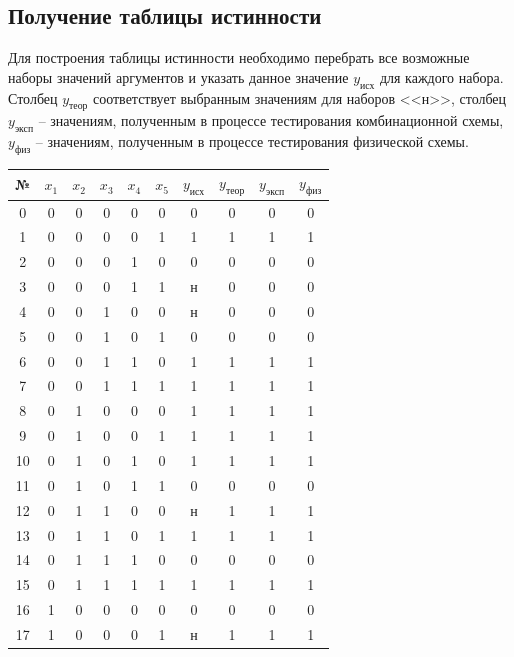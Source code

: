 \documentclass[a4paper,12pt]{article}
\begin{document}
    \subsection{Получение таблицы истинности}
    Для построения таблицы истинности необходимо перебрать все возможные
    наборы значений аргументов и указать данное значение $y_{\text{исх}}$ для каждого набора.
    Столбец $y_{\text{теор}}$ соответствует выбранным значениям для наборов <<н>>, столбец
    $y_{\text{эксп}}$ -- значениям, полученным в процессе тестирования комбинационной схемы,
    $y_{\text{физ}}$ -- значениям, полученным в процессе тестирования физической схемы.
    \begin{table}[H]
		\centering
		\begin{tabular}{|c|c|c|c|c|c|c|c|c|c|}
		\hline
		№ & $x_1$ & $x_2$ & $x_3$ & $x_4$ & $x_5$ & $y_{\text{исх}}$ & $y_{\text{теор}}$ & $y_{\text{эксп}}$ & $y_{\text{физ}}$ \\
		\hline 
		0 & 0 & 0 & 0 & 0 & 0 & 0 & 0 & 0 & 0 \\
		\hline 
		1 & 0 & 0 & 0 & 0 & 1 & 1 & 1 & 1 & 1 \\
		\hline 
		2 & 0 & 0 & 0 & 1 & 0 & 0 & 0 & 0 & 0 \\
		\hline 
		3 & 0 & 0 & 0 & 1 & 1 & н & 0 & 0 & 0 \\
		\hline 
		4 & 0 & 0 & 1 & 0 & 0 & н & 0 & 0 & 0 \\
		\hline 
		5 & 0 & 0 & 1 & 0 & 1 & 0 & 0 & 0 & 0 \\
		\hline 
		6 & 0 & 0 & 1 & 1 & 0 & 1 & 1 & 1 & 1 \\
		\hline 
		7 & 0 & 0 & 1 & 1 & 1 & 1 & 1 & 1 & 1 \\
		\hline 
		8 & 0 & 1 & 0 & 0 & 0 & 1 & 1 & 1 & 1 \\
		\hline 
		9 & 0 & 1 & 0 & 0 & 1 & 1 & 1 & 1 & 1 \\
		\hline 
		10 & 0 & 1 & 0 & 1 & 0 & 1 & 1 & 1 & 1 \\
		\hline 
		11 & 0 & 1 & 0 & 1 & 1 & 0 & 0 & 0 & 0 \\
		\hline 
		12 & 0 & 1 & 1 & 0 & 0 & н & 1 & 1 & 1 \\
		\hline 
		13 & 0 & 1 & 1 & 0 & 1 & 1 & 1 & 1 & 1 \\
		\hline 
		14 & 0 & 1 & 1 & 1 & 0 & 0 & 0 & 0 & 0 \\
		\hline 
		15 & 0 & 1 & 1 & 1 & 1 & 1 & 1 & 1 & 1 \\
		\hline 
		16 & 1 & 0 & 0 & 0 & 0 & 0 & 0 & 0 & 0 \\
		\hline 
		17 & 1 & 0 & 0 & 0 & 1 & н & 1 & 1 & 1 \\

\end{tabular}
\end{table}
\end{document}
